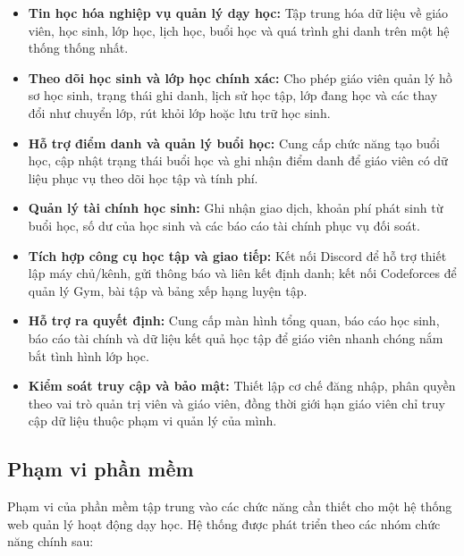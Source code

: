 \documentclass[12pt,a4paper]{article}
\begin{document}
\begin{itemize}[leftmargin=*]
    \item \textbf{Tin học hóa nghiệp vụ quản lý dạy học:} Tập trung hóa dữ liệu
    về giáo viên, học sinh, lớp học, lịch học, buổi học và quá trình ghi danh
    trên một hệ thống thống nhất.

    \item \textbf{Theo dõi học sinh và lớp học chính xác:} Cho phép giáo viên
    quản lý hồ sơ học sinh, trạng thái ghi danh, lịch sử học tập, lớp đang học
    và các thay đổi như chuyển lớp, rút khỏi lớp hoặc lưu trữ học sinh.

    \item \textbf{Hỗ trợ điểm danh và quản lý buổi học:} Cung cấp chức năng tạo
    buổi học, cập nhật trạng thái buổi học và ghi nhận điểm danh để giáo viên
    có dữ liệu phục vụ theo dõi học tập và tính phí.

    \item \textbf{Quản lý tài chính học sinh:} Ghi nhận giao dịch, khoản phí
    phát sinh từ buổi học, số dư của học sinh và các báo cáo tài chính phục vụ
    đối soát.

    \item \textbf{Tích hợp công cụ học tập và giao tiếp:} Kết nối Discord để hỗ
    trợ thiết lập máy chủ/kênh, gửi thông báo và liên kết định danh; kết nối
    Codeforces để quản lý Gym, bài tập và bảng xếp hạng luyện tập.

    \item \textbf{Hỗ trợ ra quyết định:} Cung cấp màn hình tổng quan, báo cáo
    học sinh, báo cáo tài chính và dữ liệu kết quả học tập để giáo viên nhanh
    chóng nắm bắt tình hình lớp học.

    \item \textbf{Kiểm soát truy cập và bảo mật:} Thiết lập cơ chế đăng nhập,
    phân quyền theo vai trò quản trị viên và giáo viên, đồng thời giới hạn giáo
    viên chỉ truy cập dữ liệu thuộc phạm vi quản lý của mình.
\end{itemize}

\subsection{Phạm vi phần mềm}

Phạm vi của phần mềm tập trung vào các chức năng cần thiết cho một hệ thống web
quản lý hoạt động dạy học. Hệ thống được phát triển theo các nhóm chức năng
chính sau:
\end{document}
